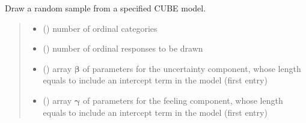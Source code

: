\documentclass[letterpaper,10pt,english]{sphinxmanual}
\begin{document}

\begin{fulllineitems}
\label{\detokenize{cubmods:cubmods.cube_ywz.draw}}
\pysigstartsignatures
{}
\pysigstopsignatures
\sphinxAtStartPar
Draw a random sample from a specified CUBE model.
\begin{quote}\begin{description}
\begin{itemize}
\item {} 
\sphinxAtStartPar
{} () \textendash{} number of ordinal categories

\item {} 
\sphinxAtStartPar
{} () \textendash{} number of ordinal responses to be drawn

\item {} 
\sphinxAtStartPar
{} () \textendash{} array \(\pmb \beta\) of parameters for the uncertainty component, whose length equals 
 to include an intercept term in the model (first entry)

\item {} 
\sphinxAtStartPar
{} () \textendash{} array \(\pmb \gamma\) of parameters for the feeling component, whose length equals 
 to include an intercept term in the model (first entry)


\end{itemize}
\end{description}
\end{quote}
\end{fulllineitems}
\end{document}
